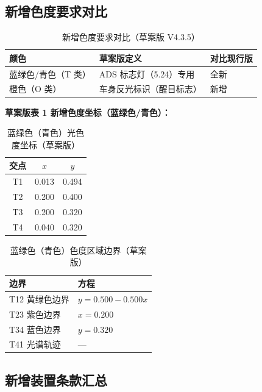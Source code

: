 \subsection{新增色度要求对比}

\begin{table}[H]
\centering
\caption{新增色度要求对比（草案版 V4.3.5）}
\begin{tabular}{|l|l|l|}
\hline
\textbf{颜色} & \textbf{草案版定义} & \textbf{对比现行版} \\
\hline
蓝绿色/青色（T 类） & ADS 标志灯（5.24）专用 & 全新 \\
\hline
橙色（O 类） & 车身反光标识（醒目标志） & 新增 \\
\hline
\end{tabular}
\end{table}

\textbf{草案版表 1 新增色度坐标（蓝绿色/青色）：}

\begin{table}[H]
\centering
\caption{蓝绿色（青色）光色度坐标（草案版）}
\begin{tabular}{|c|c|c|}
\hline
\textbf{交点} & \textbf{$x$} & \textbf{$y$} \\
\hline
T1 & 0.013 & 0.494 \\
\hline
T2 & 0.200 & 0.400 \\
\hline
T3 & 0.200 & 0.320 \\
\hline
T4 & 0.040 & 0.320 \\
\hline
\end{tabular}
\end{table}

\begin{table}[H]
\centering
\caption{蓝绿色（青色）色度区域边界（草案版）}
\begin{tabular}{|l|l|}
\hline
\textbf{边界} & \textbf{方程} \\
\hline
T12 黄绿色边界 & $y = 0.500 - 0.500x$ \\
\hline
T23 紫色边界 & $x = 0.200$ \\
\hline
T34 蓝色边界 & $y = 0.320$ \\
\hline
T41 光谱轨迹 & --- \\
\hline
\end{tabular}
\end{table}

\subsection{新增装置条款汇总}

